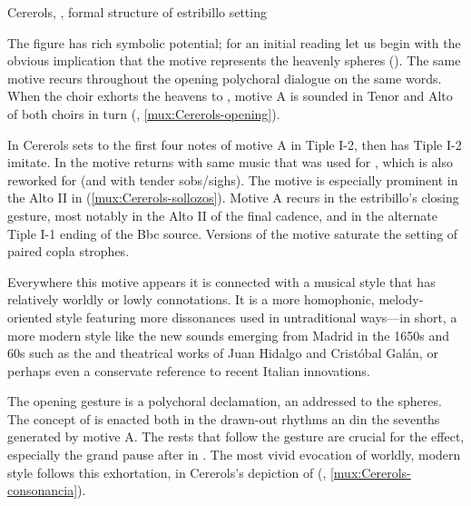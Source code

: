 {Cererols, , formal structure of estribillo setting}


The figure has rich symbolic potential; for an initial reading let us begin with
the obvious implication that the motive represents the heavenly spheres
().
The same motive recurs throughout the opening polychoral dialogue on the same
words.
When the choir exhorts the heavens to , motive A is
sounded in Tenor and Alto of both choirs in turn (,
\cref{mux:Cererols-opening}).


In  Cererols sets  to the
first four notes of motive A in Tiple I-2, then has Tiple I-2 imitate.
In  the motive returns with same music that was used for
, which is also reworked for  (and with tender sobs/sighs).
The motive is especially prominent in the Alto II in 
(\cref{mux:Cererols-sollozos}). 
Motive A recurs in the estribillo's closing gesture, most notably in the Alto II
of the final cadence, and in the alternate Tiple I-1 ending of the Bbc source.
Versions of the motive saturate the setting of paired copla strophes.


Everywhere this motive appears it is connected with a musical style that has
relatively worldly or lowly connotations.
It is a more homophonic, melody-oriented style featuring more dissonances used
in untraditional ways---in short, a more modern style like the new sounds
emerging from Madrid in the 1650s and 60s such as the  and
theatrical works of Juan Hidalgo and Cristóbal Galán, or perhaps even a
conservate reference to recent Italian innovations.%
    \citXXX[examples]

The opening gesture is a polychoral declamation, an  addressed to
the spheres.
The concept of  is enacted both in the drawn-out rhythms an
din the sevenths generated by motive A.
The rests that follow the gesture are crucial for the effect, especially the
grand pause after  in .
The most vivid evocation of worldly, modern style follows this exhortation, in
Cererols's depiction of  (,
\cref{mux:Cererols-consonancia}).

